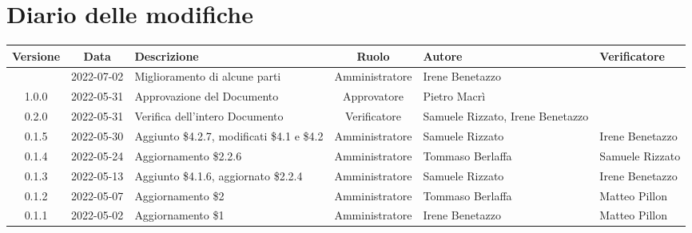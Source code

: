 \section*{Diario delle modifiche}
	\begin{center}
	\renewcommand{\arraystretch}{1.8} %
	\begin{longtable}{ |c|c|p{8em}|c|m{5em}|m{6em}| }
	\hline
	\textbf{Versione} & \textbf{Data} & \textbf{Descrizione} &  \textbf{Ruolo} &  \textbf{Autore} & \textbf{Verificatore}\\ %
	\hline %
	& 2022-07-02 & Miglioramento di alcune parti & Amministratore & Irene \newline Benetazzo & \\
    \hline
	1.0.0 & 2022-05-31 & Approvazione del Documento & Approvatore & Pietro \newline Macrì & \\
	\hline
	0.2.0 & 2022-05-31 & Verifica dell'intero Documento & Verificatore & Samuele \newline Rizzato, Irene \newline Benetazzo & \\
	\hline
	0.1.5 & 2022-05-30 & Aggiunto \$4.2.7, modificati \$4.1 e \$4.2 & Amministratore & Samuele \newline Rizzato & Irene \newline Benetazzo\\
    \hline
	0.1.4 & 2022-05-24 & Aggiornamento \$2.2.6 & Amministratore & Tommaso \newline Berlaffa & Samuele \newline Rizzato\\
    \hline
    0.1.3 & 2022-05-13 & Aggiunto \$4.1.6, aggiornato \$2.2.4 & Amministratore & Samuele \newline Rizzato & Irene \newline Benetazzo\\
    \hline
	0.1.2 & 2022-05-07 & Aggiornamento \$2 & Amministratore & Tommaso \newline Berlaffa & Matteo \newline Pillon\\
    \hline
	0.1.1 & 2022-05-02 & Aggiornamento \$1 & Amministratore & Irene \newline Benetazzo & Matteo \newline Pillon\\

\end{longtable}
\end{center}
